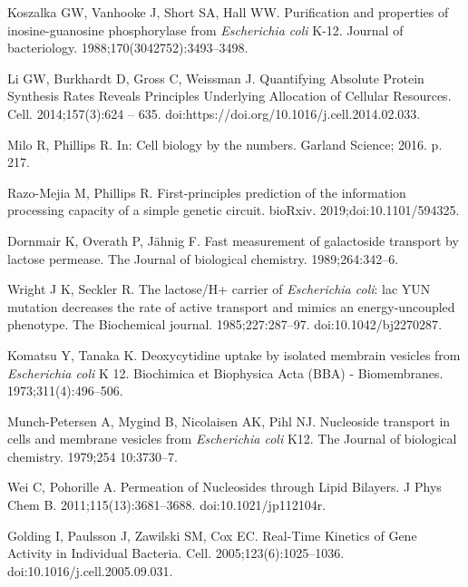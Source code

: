 \documentclass[10pt,letterpaper]{article}
\begin{document}
\begin{thebibliography}{10}
	Koszalka GW, Vanhooke J, Short SA, Hall WW.
	\newblock Purification and properties of inosine-guanosine phosphorylase from
	\emph{Escherichia coli} K-12.
	\newblock Journal of bacteriology. 1988;170(3042752):3493--3498.
	
	Li GW, Burkhardt D, Gross C, Weissman J.
	\newblock Quantifying Absolute Protein Synthesis Rates Reveals Principles
	Underlying Allocation of Cellular Resources.
	\newblock Cell. 2014;157(3):624 -- 635.
	\newblock doi:{https://doi.org/10.1016/j.cell.2014.02.033}.
	
	Milo R, Phillips R.
	\newblock In: Cell biology by the numbers. Garland Science; 2016. p. 217.
	
	Razo-Mejia M, Phillips R.
	\newblock First-principles prediction of the information processing capacity of
	a simple genetic circuit.
	\newblock bioRxiv. 2019;doi:{10.1101/594325}.
	
	Dornmair K, Overath P, Jähnig F.
	\newblock Fast measurement of galactoside transport by lactose permease.
	\newblock The Journal of biological chemistry. 1989;264:342--6.
	
	Wright J K, Seckler R.
	\newblock The lactose/H+ carrier of \emph{Escherichia coli}: lac YUN mutation
	decreases the rate of active transport and mimics an energy-uncoupled
	phenotype.
	\newblock The Biochemical journal. 1985;227:287--97.
	\newblock doi:{10.1042/bj2270287}.
	
	Komatsu Y, Tanaka K.
	\newblock Deoxycytidine uptake by isolated membrain vesicles from
	\emph{Escherichia coli} K 12.
	\newblock Biochimica et Biophysica Acta (BBA) - Biomembranes.
	1973;311(4):496--506.
	
	Munch-Petersen A, Mygind B, Nicolaisen AK, Pihl NJ.
	\newblock Nucleoside transport in cells and membrane vesicles from
	\emph{Escherichia coli} K12.
	\newblock The Journal of biological chemistry. 1979;254 10:3730--7.
	
	Wei C, Pohorille A.
	\newblock Permeation of Nucleosides through Lipid Bilayers.
	\newblock J Phys Chem B. 2011;115(13):3681--3688.
	\newblock doi:{10.1021/jp112104r}.
	
	Golding I, Paulsson J, Zawilski SM, Cox EC.
	\newblock Real-Time Kinetics of Gene Activity in Individual Bacteria.
	\newblock Cell. 2005;123(6):1025--1036.
	\newblock doi:{10.1016/j.cell.2005.09.031}.
	
\end{thebibliography}
\end{document}
